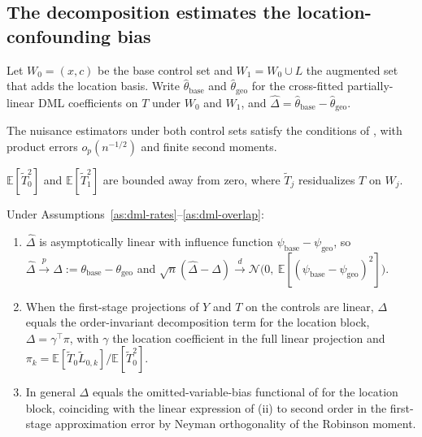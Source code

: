 \subsection{The decomposition estimates the location-confounding bias}
\label{sec:thm-decomp}

Let $W_0=(x,c)$ be the base control set and $W_1=W_0\cup L$ the augmented set that
adds the location basis. Write $\hat\theta_{\mathrm{base}}$ and
$\hat\theta_{\mathrm{geo}}$ for the cross-fitted partially-linear DML coefficients on
$T$ under $W_0$ and $W_1$, and $\hat\Delta=\hat\theta_{\mathrm{base}}-\hat\theta_{
\mathrm{geo}}$.

\begin{assumption}\label{as:dml-rates}
The nuisance estimators under both control sets satisfy the conditions of
\citet{chernozhukov2018double}, with product errors $o_p(n^{-1/2})$ and finite
second moments.
\end{assumption}
\begin{assumption}[Positivity]\label{as:dml-overlap}
$\mathbb{E}[\tilde T_0^{2}]$ and $\mathbb{E}[\tilde T_1^{2}]$ are bounded away from
zero, where $\tilde T_j$ residualizes $T$ on $W_j$.
\end{assumption}

\begin{theorem}\label{thm:decomp}
Under Assumptions~\ref{as:dml-rates}--\ref{as:dml-overlap}:
\begin{enumerate}
\item[\textup{(i)}] $\hat\Delta$ is asymptotically linear with influence function
$\psi_{\mathrm{base}}-\psi_{\mathrm{geo}}$, so $\hat\Delta\xrightarrow{p}\Delta:=
\theta_{\mathrm{base}}-\theta_{\mathrm{geo}}$ and
$\sqrt n(\hat\Delta-\Delta)\xrightarrow{d}\mathcal N\!\big(0,\
\mathbb{E}[(\psi_{\mathrm{base}}-\psi_{\mathrm{geo}})^{2}]\big)$.
\item[\textup{(ii)}] When the first-stage projections of $Y$ and $T$ on the controls
are linear, $\Delta$ equals the \citet{gelbach2016covariates} order-invariant
decomposition term for the location block, $\Delta=\gamma^{\top}\pi$, with $\gamma$
the location coefficient in the full linear projection and
$\pi_k=\mathbb{E}[\tilde T_0\tilde L_{0,k}]/\mathbb{E}[\tilde T_0^{2}]$.
\item[\textup{(iii)}] In general $\Delta$ equals the omitted-variable-bias functional
of \citet{chernozhukov2022long} for the location block, coinciding with the linear
expression of \textup{(ii)} to second order in the first-stage approximation error by
Neyman orthogonality of the Robinson moment.
\end{enumerate}
\end{theorem}

